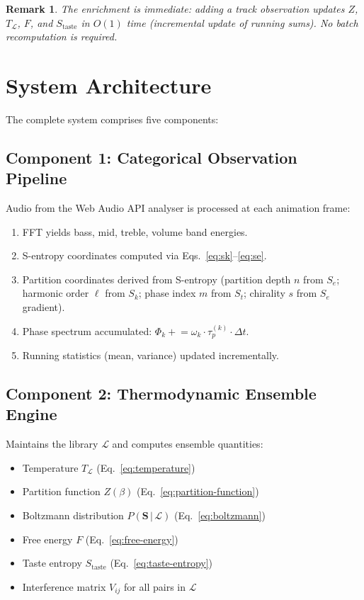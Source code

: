\documentclass[11pt,twocolumn,a4paper]{article}
\newtheorem{remark}[theorem]{Remark}
\newcommand{\Sk}{S_k}
\newcommand{\St}{S_t}
\newcommand{\Se}{S_e}
\newcommand{\Lib}{\mathcal{L}}
\begin{document}
\begin{remark}
The enrichment is immediate: adding a track observation updates $Z$,
$T_{\Lib}$, $F$, and $S_{\mathrm{taste}}$ in $O(1)$ time (incremental
update of running sums). No batch recomputation is required.
\end{remark}


\section{System Architecture}
\label{sec:architecture}

The complete system comprises five components:

\subsection{Component 1: Categorical Observation Pipeline}

Audio from the Web Audio API analyser is processed at each animation
frame:
\begin{enumerate}[leftmargin=*,itemsep=1pt]
\item FFT yields bass, mid, treble, volume band energies.
\item S-entropy coordinates computed via
  Eqs.~\eqref{eq:sk}--\eqref{eq:se}.
\item Partition coordinates derived from S-entropy (partition depth
  $n$ from $\Se$; harmonic order $\ell$ from $\Sk$; phase index $m$
  from $\St$; chirality $s$ from $\Se$ gradient).
\item Phase spectrum accumulated: $\Phi_k \mathrel{+}= \omega_k \cdot
  \tau_p^{(k)} \cdot \Delta t$.
\item Running statistics (mean, variance) updated incrementally.
\end{enumerate}

\subsection{Component 2: Thermodynamic Ensemble Engine}

Maintains the library $\Lib$ and computes ensemble quantities:
\begin{itemize}[leftmargin=*,itemsep=1pt]
\item Temperature $T_{\Lib}$ (Eq.~\eqref{eq:temperature})
\item Partition function $Z(\beta)$
  (Eq.~\eqref{eq:partition-function})
\item Boltzmann distribution $P(\mathbf{S}\,|\,\Lib)$
  (Eq.~\eqref{eq:boltzmann})
\item Free energy $F$ (Eq.~\eqref{eq:free-energy})
\item Taste entropy $S_{\mathrm{taste}}$
  (Eq.~\eqref{eq:taste-entropy})
\item Interference matrix $V_{ij}$ for all pairs in $\Lib$
\end{itemize}
\end{document}
